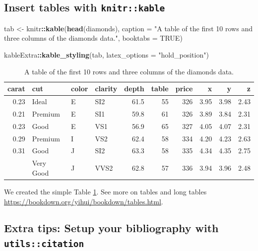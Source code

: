 \documentclass[12pt,]{article}
\newenvironment{Shaded}{\begin{snugshade}}{\end{snugshade}}
\newcommand{\KeywordTok}[1]{\textcolor[rgb]{0.13,0.29,0.53}{\textbf{#1}}}
\newcommand{\DataTypeTok}[1]{\textcolor[rgb]{0.13,0.29,0.53}{#1}}
\newcommand{\StringTok}[1]{\textcolor[rgb]{0.31,0.60,0.02}{#1}}
\newcommand{\OtherTok}[1]{\textcolor[rgb]{0.56,0.35,0.01}{#1}}
\newcommand{\OperatorTok}[1]{\textcolor[rgb]{0.81,0.36,0.00}{\textbf{#1}}}
\newcommand{\NormalTok}[1]{#1}
\begin{document}
\subsection{\texorpdfstring{Insert tables with
\texttt{knitr::kable}}{Insert tables with knitr::kable}}\label{insert-tables-with-knitrkable}

\begin{Shaded}
\begin{Highlighting}[]
\NormalTok{tab <-}\StringTok{ }\NormalTok{knitr}\OperatorTok{::}\KeywordTok{kable}\NormalTok{(}\KeywordTok{head}\NormalTok{(diamonds), }\DataTypeTok{caption =} \StringTok{"A table of the first 10 rows and three columns of the diamonds data."}\NormalTok{, }
    \DataTypeTok{booktabs =} \OtherTok{TRUE}\NormalTok{)}

\NormalTok{kableExtra}\OperatorTok{::}\KeywordTok{kable_styling}\NormalTok{(tab, }\DataTypeTok{latex_options =} \StringTok{"hold_position"}\NormalTok{)}
\end{Highlighting}
\end{Shaded}

\begin{table}[!h]

\caption{\label{tab:tree-diamonds}A table of the first 10 rows and three columns of the diamonds data.}
\centering
\begin{tabular}{rlllrrrrrr}
\toprule
carat & cut & color & clarity & depth & table & price & x & y & z\\
\midrule
0.23 & Ideal & E & SI2 & 61.5 & 55 & 326 & 3.95 & 3.98 & 2.43\\
0.21 & Premium & E & SI1 & 59.8 & 61 & 326 & 3.89 & 3.84 & 2.31\\
0.23 & Good & E & VS1 & 56.9 & 65 & 327 & 4.05 & 4.07 & 2.31\\
0.29 & Premium & I & VS2 & 62.4 & 58 & 334 & 4.20 & 4.23 & 2.63\\
0.31 & Good & J & SI2 & 63.3 & 58 & 335 & 4.34 & 4.35 & 2.75\\
\addlinespace
0.24 & Very Good & J & VVS2 & 62.8 & 57 & 336 & 3.94 & 3.96 & 2.48\\
\bottomrule
\end{tabular}
\end{table}

We created the simple Table \ref{tab:tree-diamonds}. See more on tables
and long tables \url{https://bookdown.org/yihui/bookdown/tables.html}.

\subsection{\texorpdfstring{Extra tips: Setup your bibliography with
\texttt{utils::citation}}{Extra tips: Setup your bibliography with utils::citation}}\label{extra-tips-setup-your-bibliography-with-utilscitation}
\end{document}
